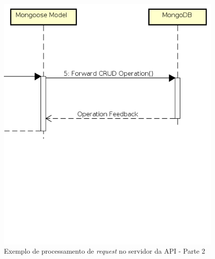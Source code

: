 \begin{figure}
    \begin{center}
        \includegraphics[scale=0.7]{imagens/API_Sequence_Diagram_2.png}
    \end{center}
	\caption{\label{fig:seq_api_2}Exemplo de processamento de \textit{request} no servidor da API - Parte 2}
\end{figure}